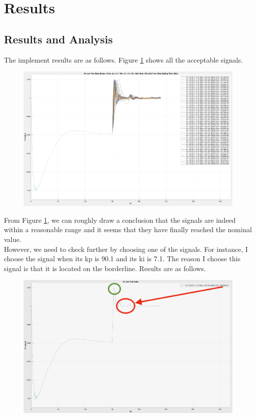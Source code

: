 \documentclass{report}
\begin{document}
\section{Results} %
\subsection{Results and Analysis}
The implement results are as follows. Figure \textcolor{red}{\ref{4_4_1_result1}} shows all the acceptable signals.

\begin{figure}[htbp]
\centering
\includegraphics[width = \textwidth]{figure/4_4_1_result1.jpeg}
\caption{}
\label{4_4_1_result1}
\end{figure}

From Figure \textcolor{red}{\ref{4_4_1_result1}}, we can roughly draw a conclusion that the signals are indeed within a reasonable range and it seems that they have finally reached the nominal value. \\

However, we need to check further by choosing one of the signals. For instance, I choose the signal when its kp is 90.1 and its ki is 7.1. The reason I choose this signal is that it is located on the borderline. Results are as follows. \\

\begin{figure}[htbp]
\centering
\includegraphics[width = \textwidth]{figure/4_4_1_result2.jpeg}
\caption{}
\label{4_4_1_result2}
\end{figure}
\end{document}
